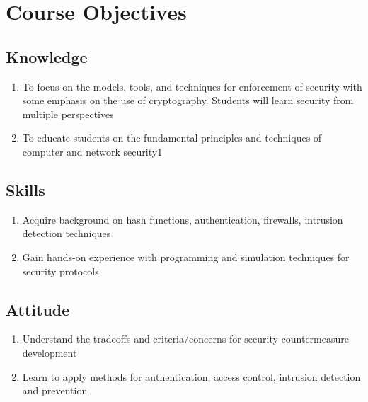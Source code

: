 \documentclass[openany]{book}
\begin{document}
\tableofcontents
\frontmatter

\chapter{Course Objectives}
\section{Knowledge}
\begin{enumerate}
	\item  To focus on the models, tools, and techniques for enforcement of security with some emphasis on
	      the use of cryptography. Students will learn security from multiple perspectives
	\item To educate students on the fundamental principles and techniques of computer and network
	      security1
\end{enumerate}

\section{Skills}
\begin{enumerate}
	\item Acquire background on hash functions, authentication, firewalls, intrusion detection techniques
	\item Gain hands-on experience with programming and simulation techniques for security protocols
\end{enumerate}


\section{Attitude}
\begin{enumerate}
	\item Understand the tradeoffs and criteria/concerns for security countermeasure development
	\item Learn to apply methods for authentication, access control, intrusion detection and prevention
\end{enumerate}
\end{document}
